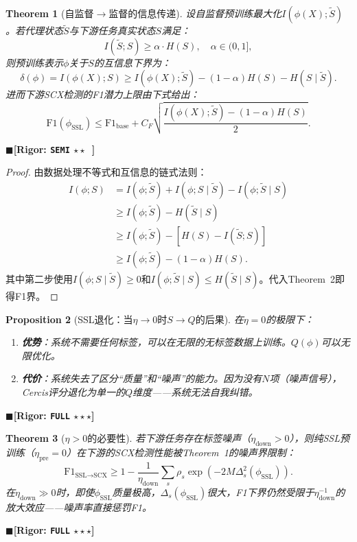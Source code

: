 \documentclass[12pt,a4paper]{ctexart}
\newtheorem{theorem}{Theorem}[section]
\newtheorem{proposition}[theorem]{Proposition}
\theoremstyle{definition}
\theoremstyle{remark}
\newcommand{\rigorFull}{$\blacksquare$\;\textbf{[Rigor: \texttt{FULL} $\star\star\star$]}}
\newcommand{\rigorSemi}{$\blacksquare$\;\textbf{[Rigor: \texttt{SEMI} $\star\star\;\;$]}}
\begin{document}
\begin{theorem}[自监督$\to$监督的信息传递]
\label{thm:7.1}
设自监督预训练最大化$I(\phi(X); \tilde{S})$。若代理状态$\tilde{S}$与下游任务真实状态$S$满足：
\begin{equation}
I(\tilde{S}; S) \geq \alpha \cdot H(S), \quad \alpha \in (0, 1],
\end{equation}
则预训练表示$\phi$关于$S$的互信息下界为：
\begin{equation}
\delta(\phi) = I(\phi(X); S) \geq I(\phi(X); \tilde{S}) - (1-\alpha)H(S) - H(S \mid \tilde{S}).
\end{equation}
进而下游SCX检测的F1潜力上限由下式给出：
\begin{equation}
\boxed{\mathrm{F1}(\phi_{\text{SSL}}) \leq \mathrm{F1}_{\text{base}} + C_F\sqrt{\frac{I(\phi(X); \tilde{S}) - (1-\alpha)H(S)}{2}}}.
\end{equation}
\end{theorem}
\rigorSemi

\begin{proof}
由数据处理不等式和互信息的链式法则：
\begin{align}
I(\phi; S) &= I(\phi; \tilde{S}) + I(\phi; S \mid \tilde{S}) - I(\phi; \tilde{S} \mid S) \\
           &\geq I(\phi; \tilde{S}) - H(\tilde{S} \mid S) \\
           &\geq I(\phi; \tilde{S}) - [H(S) - I(\tilde{S}; S)] \\
           &\geq I(\phi; \tilde{S}) - (1-\alpha)H(S).
\end{align}
其中第二步使用$I(\phi; S \mid \tilde{S}) \geq 0$和$I(\phi; \tilde{S} \mid S) \leq H(\tilde{S} \mid S)$。代入Theorem~2即得F1界。
\end{proof}

\begin{proposition}[SSL退化：当$\eta \to 0$时$S \to Q$的后果]
\label{prop:14}
在$\eta = 0$的极限下：
\begin{enumerate}[label=\arabic*.]
\item \textbf{优势}：系统不需要任何标签，可以在无限的无标签数据上训练。$Q(\phi)$可以无限优化。
\item \textbf{代价}：系统失去了区分``质量''和``噪声''的能力。因为没有$N$项（噪声信号），Cercis评分退化为单一的$Q$维度——系统无法自我纠错。
\end{enumerate}
\end{proposition}
\rigorFull

\begin{theorem}[$\eta > 0$的必要性]
\label{thm:7.2}
若下游任务存在标签噪声（$\eta_{\text{down}} > 0$），则纯SSL预训练（$\eta_{\text{pre}} = 0$）在下游的SCX检测性能被Theorem~1的噪声界限制：
\begin{equation}
\mathrm{F1}_{\text{SSL}\to\text{SCX}} \geq 1 - \frac{1}{\eta_{\text{down}}}\sum_s \rho_s \exp(-2M\Delta_s^2(\phi_{\text{SSL}})).
\end{equation}
在$\eta_{\text{down}} \gg 0$时，即使$\phi_{\text{SSL}}$质量极高，$\Delta_s(\phi_{\text{SSL}})$很大，F1下界仍然受限于$\eta_{\text{down}}^{-1}$的放大效应——噪声率直接惩罚F1。
\end{theorem}
\rigorFull
\end{document}
